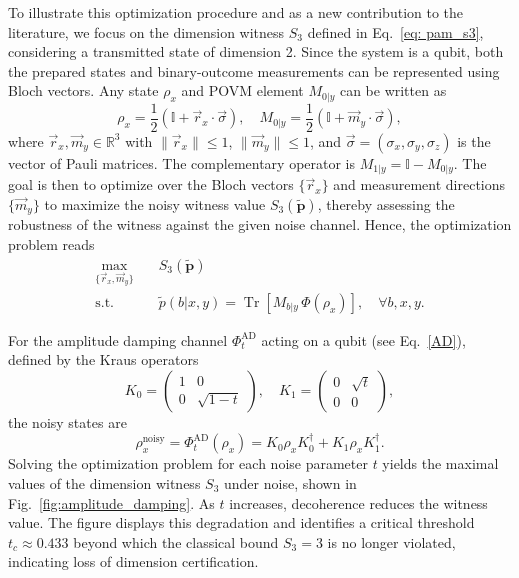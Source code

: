 \documentclass[aps,pra,reprint, superscriptaddress,showkeys]{revtex4-2}
\theoremstyle{plain}
\begin{document}
To illustrate this optimization procedure and as a  new contribution to the literature, we focus on the dimension witness \(S_3\) defined in Eq.~\eqref{eq: pam_s3}, considering a transmitted state of dimension 2. Since the system is a qubit, both the prepared states and binary-outcome measurements can be represented using Bloch vectors. Any state \(\rho_x\) and POVM element \(M_{0|y}\) can be written as
\begin{equation}
    \rho_x = \frac{1}{2}\left( \mathbb{I} + \vec{r}_x \cdot \vec{\sigma} \right), \quad
    M_{0|y} = \frac{1}{2}\left( \mathbb{I} + \vec{m}_y \cdot \vec{\sigma} \right),
\end{equation}
where \(\vec{r}_x, \vec{m}_y \in \mathbb{R}^3\) with \(\|\vec{r}_x\| \leq 1\), \(\|\vec{m}_y\| \leq 1\), and \(\vec{\sigma} = (\sigma_x, \sigma_y, \sigma_z)\) is the vector of Pauli matrices. The complementary operator is \(M_{1|y} = \mathbb{I} - M_{0|y}\). The goal is then to optimize over the Bloch vectors \(\{\vec{r}_x\}\) and measurement directions \(\{\vec{m}_y\}\) to maximize the noisy witness value \(S_3(\mathbf{\tilde{p}})\), thereby assessing the robustness of the witness against the given noise channel. Hence, the optimization problem reads
\begin{equation}
\begin{aligned}
    \max_{\{\vec{r}_x, \vec{m}_y\}} \quad & S_3(\mathbf{\tilde{p}}) \\
    \text{s.t.} \quad & \tilde{p}(b|x,y) = \operatorname{Tr}\left[ M_{b|y} \, \Phi(\rho_x) \right], \quad \forall b,x,y.
\end{aligned}
\end{equation}

For the amplitude damping channel \(\Phi_t^{\mathrm{AD}}\) acting on a qubit (see Eq.~\eqref{AD}), defined by the Kraus operators
\begin{equation}
    K_0 = \begin{pmatrix} 1 & 0 \\ 0 & \sqrt{1 - t} \end{pmatrix}, \quad
    K_1 = \begin{pmatrix} 0 & \sqrt{t} \\ 0 & 0 \end{pmatrix},
\end{equation}
the noisy states are
\begin{equation}
    \rho_x^{\mathrm{noisy}} = \Phi_t^{\mathrm{AD}}(\rho_x) = K_0 \rho_x K_0^\dagger + K_1 \rho_x K_1^\dagger.
\end{equation}
Solving the optimization problem for each noise parameter \(t\) yields the maximal values of the dimension witness \(S_3\) under noise, shown in Fig.~\ref{fig:amplitude_damping}. As \(t\) increases, decoherence reduces the witness value. The figure displays this degradation and identifies a critical threshold \(t_c \approx 0.433\) beyond which the classical bound \(S_3 = 3\) is no longer violated, indicating loss of dimension certification.
\end{document}
